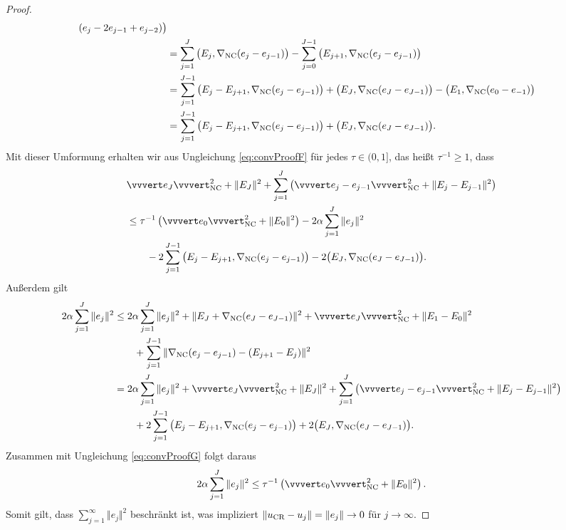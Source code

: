 \begin{proof}
\begin{align*}
    (e_j-2e_{j-1}+e_{j-2})\big)\\
    &=\sum_{j=1}^J\big(E_j,\nabla_\textup{NC}(e_j-e_{j-1})\big)
    -
    \sum_{j=0}^{J-1}\big(E_{j+1},\nabla_\textup{NC}(e_j-e_{j-1})\big) \\
    &= 
    \sum_{j=1}^{J-1} 
    \big(E_j-E_{j+1},\nabla_\textup{NC}(e_j-e_{j-1})\big)
    +\big(E_J,\nabla_\textup{NC}(e_J-e_{J-1})\big)
    - \big(E_1, \nabla_\textup{NC}(e_0-e_{-1})\big) \\
    &= 
    \sum_{j=1}^{J-1} 
    \big(E_j-E_{j+1},\nabla_\textup{NC}(e_j-e_{j-1})\big)
    +\big(E_J,\nabla_\textup{NC}(e_J-e_{J-1})\big).
  \end{align*}
  Mit dieser Umformung erhalten wir aus Ungleichung \eqref{eq:convProofF} für
  jedes $\tau\in(0,1]$, das heißt $\tau^{-1}\geq 1$, dass
  \begin{equation}
    \label{eq:convProofG}
    \begin{aligned}
      &\vvvert e_J \vvvert^2_\nc +\Vert E_J \Vert^2 
      +\sum_{j=1}^J\left(\vvvert e_j-e_{j-1} \vvvert_\nc^2 + 
      \Vert E_j-E_{j-1}\Vert^2\right) \\
      &\leq 
      \tau^{-1}\left(\vvvert e_0 \vvvert_\nc^2 + \Vert E_0 \Vert^2 \right)
      -2\alpha\sum_{j=1}^J \Vert e_j\Vert^2 \\
      &\quad\quad
      -2 \sum_{j=1}^{J-1} \big(E_j-E_{j+1},\gradnc(e_j-e_{j-1})\big)
      -2\big(E_J,\gradnc(e_J-e_{J-1})\big).
    \end{aligned}
  \end{equation}
  Außerdem gilt
  \begin{align*}
    2\alpha\sum_{j=1}^J\Vert e_j\Vert^2 
    &\leq
    2\alpha\sum_{j=1}^J\Vert e_j\Vert^2
    +\Vert E_J + \gradnc(e_J-e_{J-1}) \Vert^2 
    + \vvvert e_J \vvvert^2_\nc 
    + \Vert E_1 - E_0 \Vert^2 \\
    &\quad\quad
    + \sum_{j=1}^{J-1}  
      \Vert \gradnc(e_j-e_{j-1}) - (E_{j+1} - E_j ) \Vert^2 \\
    &= 
    2\alpha\sum_{j=1}^J\Vert e_j\Vert^2
    +\vvvert e_J \vvvert^2_\nc + \Vert E_J \Vert^2 
    + \sum_{j=1}^J \left( \vvvert e_j-e_{j-1} \vvvert^2_\nc
    + \Vert E_j - E_{j-1} \Vert^2 \right)\\
    &\quad\quad
    + 2\sum_{j=1}^{J-1}\big(E_j-E_{j+1},\gradnc(e_j-e_{j-1})\big)
    + 2\big(E_{J},\gradnc(e_J-e_{J-1})\big).
  \end{align*}
  Zusammen mit Ungleichung \eqref{eq:convProofG} folgt daraus
  \begin{align}
    \label{eq:updateBound}
    2\alpha\sum_{j=1}^J\Vert e_j\Vert^2 
    \leq
    \tau^{-1}\left(\vvvert e_0\vvvert^2_\nc + \Vert E_0\Vert^2\right).
  \end{align}
  Somit gilt, dass $\sum_{j=1}^\infty \Vert e_j\Vert^2$ beschränkt
  ist, was impliziert $\Vert u_\textup{CR}-u_j\Vert=\Vert e_j\Vert\rightarrow 0$ für
  $j\rightarrow \infty$.
\end{proof}
